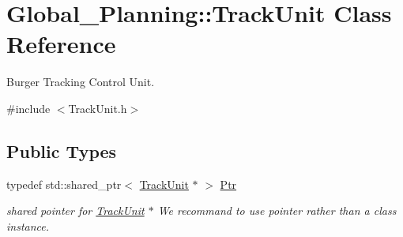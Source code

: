 \hypertarget{class_global___planning_1_1_track_unit}{}\section{Global\+\_\+\+Planning\+:\+:Track\+Unit Class Reference}
\label{class_global___planning_1_1_track_unit}


Burger Tracking Control Unit.  




{\ttfamily \#include $<$Track\+Unit.\+h$>$}

\subsection*{Public Types}
\begin{DoxyCompactItemize}
\item 
\mbox{\label{class_global___planning_1_1_track_unit_a1e4cadd188e647288b21578bd59d624a}} 
typedef std\+::shared\+\_\+ptr$<$ \hyperlink{class_global___planning_1_1_track_unit}{Track\+Unit} $\ast$ $>$ \hyperlink{class_global___planning_1_1_track_unit_a1e4cadd188e647288b21578bd59d624a}{Ptr}
\begin{DoxyCompactList}\small\item\em shared pointer for \hyperlink{class_global___planning_1_1_track_unit}{Track\+Unit} $\ast$ We recommand to use pointer rather than a class instance. \end{DoxyCompactList}\end{DoxyCompactItemize}
